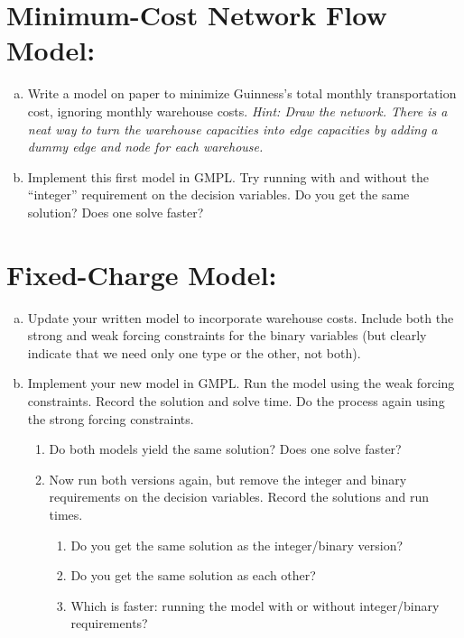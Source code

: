 \documentclass[11pt]{article}
\theoremstyle{definition}
\begin{document}
\section{Minimum-Cost Network Flow Model:}
\begin{enumerate}[a.]
\item Write a model on paper to minimize Guinness's total monthly transportation cost, ignoring monthly warehouse costs.  \emph{Hint:  Draw the network.  There is a neat way to turn the warehouse capacities into edge capacities by adding a dummy edge and node for each warehouse.}
\item Implement this first model in GMPL.  Try running with and without the ``integer'' requirement on the decision variables.  Do you get the same solution?  Does one solve faster?
\end{enumerate}

\section{Fixed-Charge Model:}
\begin{enumerate}[a.]
\item Update your written model to incorporate warehouse costs.  Include both the strong and weak forcing constraints for the binary variables (but clearly indicate that we need only one type or the other, not both).
\item Implement your new model in GMPL.  Run the model using the weak forcing constraints.  Record the solution and solve time.  Do the process again using the strong forcing constraints.
\begin{enumerate}
	\item  Do both models yield the same solution?  Does one solve faster?
	\item Now run both versions again, but remove the integer and binary requirements on the decision variables.  Record the solutions and run times.  
	\begin{enumerate}
		\item Do you get the same solution as the integer/binary version? 
		\item Do you get the same solution as each other? 
		\item Which is faster:  running the model with or without integer/binary requirements?
	\end{enumerate}	
\end{enumerate}
\end{enumerate}
		
\end{document}
